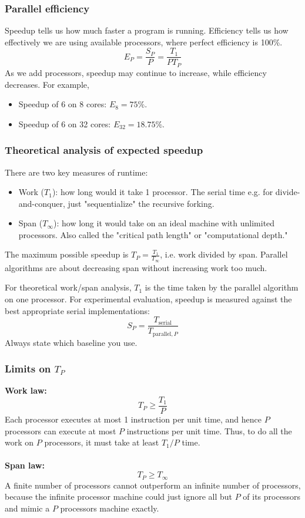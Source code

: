 \documentclass[11pt]{article}
\begin{document}
\subsubsection{Parallel efficiency}
Speedup tells us how much faster a program is running.
Efficiency tells us how effectively we are using available processors, where perfect efficiency is 100\%.
$$
E_P=\frac{S_P}{P}=\frac{T_1}{PT_P}
$$
As we add processors, speedup may continue to increase, while efficiency decreases. For example,
\begin{itemize}
    \item Speedup of 6 on 8 cores: $E_8=75\%$.
    \item Speedup of 6 on 32 cores: $E_{32}=18.75\%$.
\end{itemize}
\subsubsection{Theoretical analysis of expected speedup}
There are two key measures of runtime:
\begin{itemize}
    \item Work ($T_1$): how long would it take 1 processor. The serial time e.g. for divide-and-conquer, just "sequentialize" the recursive forking.
    \item Span ($T_\infty$): how long it would take on an ideal machine with unlimited processors. Also called the "critical path length" or "computational depth."
\end{itemize}
The maximum possible speedup is $T_P=\frac{T_1}{T_\infty}$, i.e. work divided by span.
Parallel algorithms are about decreasing span without increasing work too much.
\begin{note}[Note]
For theoretical work/span analysis, $T_1$ is the time taken by the parallel algorithm on one processor. For experimental evaluation, speedup is measured against the best appropriate serial implementations:
$$
S_P=\frac{T_{\text{serial}}}{T_{\text{parallel},P}}
$$
Always state which baseline you use.
\end{note}
\subsubsection{Limits on $T_P$}
\textbf{Work law:}
$$
\boxed{T_P\geq\frac{T_1}{P}}
$$
Each processor executes at most 1 instruction per unit time, and hence $P$ processors can execute at most $P$ instructions per unit time.
Thus, to do all the work on $P$ processors, it must take at least $T_1/P$ time.
\\\\
\textbf{Span law:}
$$
\boxed{T_P\geq T_\infty}
$$
A finite number of processors cannot outperform an infinite number of processors, because the infinite processor machine could just ignore all but $P$ of its processors and mimic a $P$ processors machine exactly.
\end{document}
